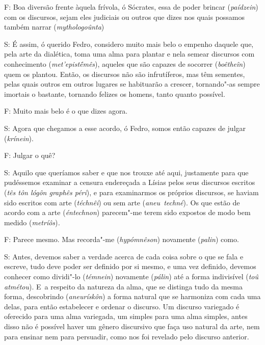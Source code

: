 \bekker{[276e]} F: Boa diversão frente àquela frívola, ó Sócrates, essa de
poder brincar (\emph{paídzein}) com os discursos, sejam eles judiciais
ou outros que dizes nos quais possamos também narrar
(\emph{mythologoûnta})

 

S: É assim, ó querido Fedro, considero muito mais belo o empenho daquele
que, pela arte da dialética, toma uma alma para plantar e nela semear
discursos com conhecimento (\emph{met'epistḗmês}), \bekker{[277a]} aqueles
que são capazes de socorrer (\emph{boêtheîn}) quem os plantou. Então, os
discursos não são infrutíferos, mas têm sementes, pelas quais outros em
outros lugares se habituarão a crescer, tornando"-as sempre imortais o
bastante, tornando felizes os homens, tanto quanto possível.

 

F: Muito mais belo é o que dizes agora.

 

S: Agora que chegamos a esse acordo, ó Fedro, somos então capazes de
julgar (\emph{krínein}).

 

F: Julgar o quê?

 

S: Aquilo que queríamos saber e que nos trouxe até aqui, justamente para
que pudéssemos examinar a censura endereçada a Lísias pelos seus
discursos escritos (\emph{tês tôn lógôn graphês péri}), \bekker{[277b]} e
para examinarmos os próprios discursos, se haviam sido escritos com arte
(\emph{téchnêi}) ou sem arte (\emph{aneu~techné}). Os que estão de
acordo com a arte (\emph{éntechnon}) parecem"-me terem sido expostos de
modo bem medido (\emph{metríôs})\emph{.}

 

F: Parece mesmo. Mas recorda"-me (\emph{hypómnêson}) novamente
(\emph{palin}) como.

 

S: Antes, devemos saber a verdade acerca de cada coisa sobre o que se
fala e escreve, tudo deve poder ser definido por si mesmo, e uma vez
definido, devemos conhecer como dividi"-lo (\emph{témnein}) novamente
(\emph{pálin}) até a forma indivisível (\emph{toû atmétou}). E~a
respeito da natureza da alma, que se distinga tudo da mesma forma,
\bekker{[277c]} descobrindo (\emph{aneurískôn}) a forma natural que se
harmoniza com cada uma delas, para então estabelecer e ordenar o
discurso. Um discurso variegado é oferecido para uma alma variegada, um
simples para uma alma simples, antes disso não é possível haver um
gênero discursivo que faça uso natural da arte, nem para ensinar nem
para persuadir, como nos foi revelado pelo discurso anterior.


